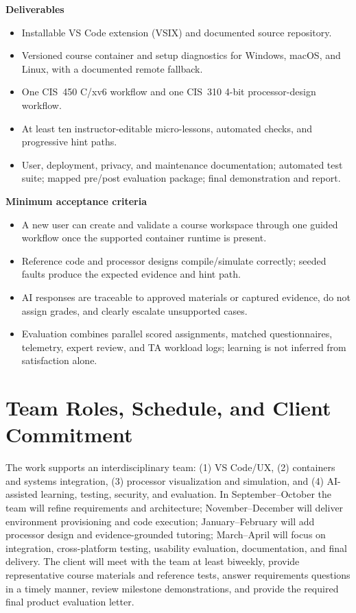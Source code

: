 \documentclass[10pt,letterpaper]{article}
\begin{document}
\begin{minipage}[t]{0.49\linewidth}
\textbf{Deliverables}
\begin{itemize}
  \item Installable VS Code extension (VSIX) and documented source repository.
  \item Versioned course container and setup diagnostics for Windows, macOS, and Linux, with a documented remote fallback.
  \item One CIS~450 C/xv6 workflow and one CIS~310 4-bit processor-design workflow.
  \item At least ten instructor-editable micro-lessons, automated checks, and progressive hint paths.
  \item User, deployment, privacy, and maintenance documentation; automated test suite; mapped pre/post evaluation package; final demonstration and report.
\end{itemize}
\end{minipage}\hfill
\begin{minipage}[t]{0.49\linewidth}
\textbf{Minimum acceptance criteria}
\begin{itemize}
  \item A new user can create and validate a course workspace through one guided workflow once the supported container runtime is present.
  \item Reference code and processor designs compile/simulate correctly; seeded faults produce the expected evidence and hint path.
  \item AI responses are traceable to approved materials or captured evidence, do not assign grades, and clearly escalate unsupported cases.
  \item Evaluation combines parallel scored assignments, matched questionnaires, telemetry, expert review, and TA workload logs; learning is not inferred from satisfaction alone.
\end{itemize}
\end{minipage}

\section*{Team Roles, Schedule, and Client Commitment}

The work supports an interdisciplinary team: (1) VS Code/UX, (2) containers and systems integration, (3) processor visualization and simulation, and (4) AI-assisted learning, testing, security, and evaluation. In September--October the team will refine requirements and architecture; November--December will deliver environment provisioning and code execution; January--February will add processor design and evidence-grounded tutoring; March--April will focus on integration, cross-platform testing, usability evaluation, documentation, and final delivery. The client will meet with the team at least biweekly, provide representative course materials and reference tests, answer requirements questions in a timely manner, review milestone demonstrations, and provide the required final product evaluation letter.
\end{document}
